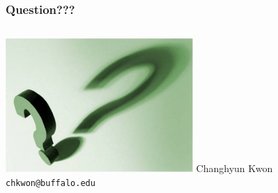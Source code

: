 \documentclass[xcolor=dvipsnames, unicode]{beamer}
\begin{document}
\begin{frame}
\frametitle{Question???}
\begin{columns}[c]
\column{1.5in}
    \includegraphics[height=2in]{question}
\column{1.5in}
    Changhyun Kwon\\
    \texttt{chkwon@buffalo.edu}
\end{columns}
\end{frame}


%
%
\end{document}

